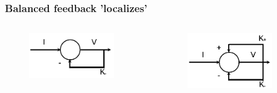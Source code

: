 \documentclass{beamer}
\begin{document}
\begin{frame}
\begin{columns}[c]
\end{columns}
\end{frame}


\begin{frame}
\frametitle{Balanced feedback 'localizes'}
\vspace{-2ex}
\begin{columns}[c]

\begin{figure}
\includegraphics[width=1\linewidth]{linear}
\end{figure}
\\

\begin{figure}
\includegraphics[width=1\linewidth]{localized}
\end{figure}
\vspace{-5ex}
\\


\end{columns}
\end{frame}
\end{document}
